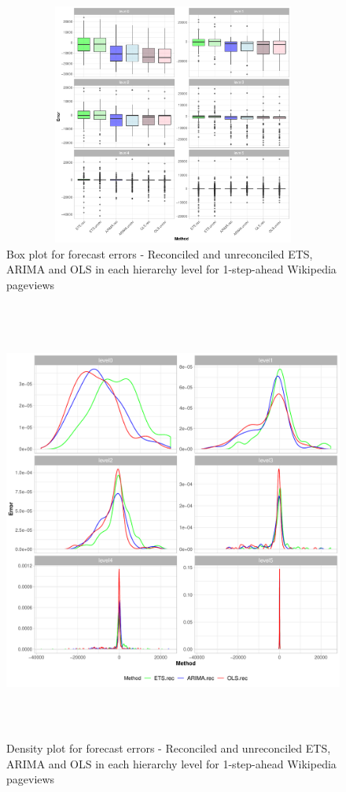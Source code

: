 \documentclass[11pt,a4paper,]{article}
\begin{document}
\begin{figure}

{\centering \includegraphics[width=450px,height=300px]{Paper-Figures/results_Wikipedia/boxplot_1} 

}

\caption{Box plot for forecast errors -  Reconciled and unreconciled ETS, ARIMA and OLS in each hierarchy level for 1-step-ahead Wikipedia pageviews}\label{fig:boxplotrollingwiki}
\end{figure}

\begin{figure}

{\centering \includegraphics[width=450px,height=550px]{Paper-Figures/results_Wikipedia/densityplot_1} 

}

\caption{Density plot for forecast errors -  Reconciled and unreconciled ETS, ARIMA and OLS in each hierarchy level for 1-step-ahead Wikipedia pageviews}\label{fig:densityplotrollingwiki}
\end{figure}
\end{document}
